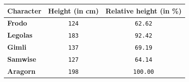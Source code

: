 %
%
%
\begin{tabular}{lcc} 
    \toprule
    \rowcolor{white}\textbf{Character} & \textbf{Height (in cm)} &  \textbf{Relative height (in \%)}\\
    \midrule
    \textbf{Frodo} & \texttt{124} & \texttt{62.62}  \\
    \rowcolor{gray!10}\textbf{Legolas} & \texttt{183} & \texttt{92.42} \\
    \textbf{Gimli} & \texttt{137} & \texttt{69.19} \\
    \rowcolor{gray!10}\textbf{Samwise} & \texttt{127} & \texttt{64.14} \\
    \textbf{Aragorn} & \texttt{198} & \texttt{100.00} \\
    \bottomrule
\end{tabular}
